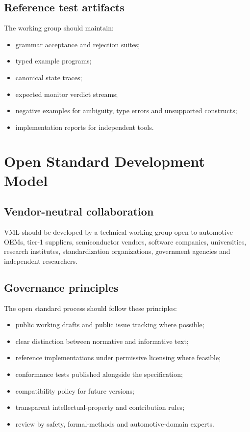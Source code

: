 \documentclass[11pt,a4paper]{article}
\newcommand{\VML}{\textsc{VML}}
\begin{document}
\subsection{Reference test artifacts}
The working group should maintain:
\begin{itemize}
  \item grammar acceptance and rejection suites;
  \item typed example programs;
  \item canonical state traces;
  \item expected monitor verdict streams;
  \item negative examples for ambiguity, type errors and unsupported constructs;
  \item implementation reports for independent tools.
\end{itemize}

\section{Open Standard Development Model}
\subsection{Vendor-neutral collaboration}
\VML{} should be developed by a technical working group open to automotive OEMs, tier-1 suppliers, semiconductor vendors, software companies, universities, research institutes, standardization organizations, government agencies and independent researchers.

\subsection{Governance principles}
The open standard process should follow these principles:
\begin{itemize}
  \item public working drafts and public issue tracking where possible;
  \item clear distinction between normative and informative text;
  \item reference implementations under permissive licensing where feasible;
  \item conformance tests published alongside the specification;
  \item compatibility policy for future versions;
  \item transparent intellectual-property and contribution rules;
  \item review by safety, formal-methods and automotive-domain experts.
\end{itemize}
\end{document}

